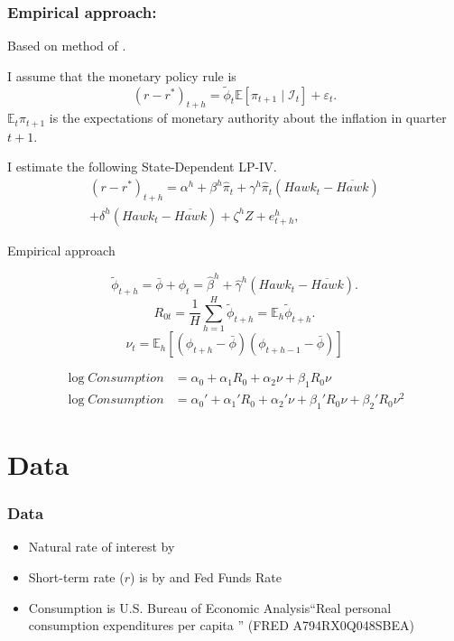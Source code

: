 \documentclass[11pt,pdf,aspectratio=129]{beamer}
\begin{document}
\begin{frame}\frametitle{Empirical approach:}
Based on method of \citet{HIM2023}.

I assume that the monetary policy rule is 
\[\left(r-r^*\right)_{t+h}=\tilde\phi_t\mathbb{E}\left[\pi_{t+1}\mid \mathcal{I}_t\right]+\varepsilon_t.\]
$\mathbb{E}_t\pi_{t+1}$ is the expectations of monetary authority about the inflation in quarter $t+1$.

I estimate the following State-Dependent LP-IV.
\begin{multline*}
    \left(r-r^*\right)_{t+h}=\alpha^h+\beta^h \hat\pi_t+\gamma^h \hat\pi_t\left(\mathit{Hawk}_{t}-\overline{\mathit{Hawk}}\right)\\ +\delta^h\left(\mathit{Hawk}_{t}-\overline{\mathit{Hawk}}\right)+\zeta^hZ+e_{t+h}^h,
\end{multline*}
\end{frame}

\begin{frame}{Empirical approach }

    \[\tilde \phi_{t+h}=\bar\phi+\phi_t=\hat \beta^h+\hat\gamma^h \left(\mathit{Hawk}_{t}-\overline{\mathit{Hawk}}\right).\]
    \[R_{0t}=\frac{1}{H}\sum_{h=1}^{H} \tilde \phi_{t+h}=\mathbb{E}_h \tilde \phi_{t+h}.\]
    \[\nu_t=\mathbb{E}_{h}\left[\left(\phi_{t+h}-\bar \phi\right)\left(\phi_{t+h-1}-\bar \phi\right)\right]\]

    \begin{align}
        \log \mathit{Consumption}&=\alpha_0+\alpha_1 R_0+\alpha_2\nu+\beta_1 R_0\nu \label{eq:linear}\\
        \log \mathit{Consumption}&=\alpha_0'+\alpha_1' R_0+\alpha_2'\nu+\beta_1' R_0\nu + \beta_2' R_0\nu^2\label{eq:quadratic}
    \end{align} 
\end{frame}






\section{Data}
\begin{frame}\frametitle{Data}
\begin{itemize}
        \item Natural rate of interest by \citet{HLW2017,HLW2023}
        \item Short-term rate ($r$) is by \citet{WuXia2016} and Fed Funds Rate 
        \item Consumption is U.S. Bureau of Economic Analysis``Real personal consumption expenditures per capita ''  (FRED A794RX0Q048SBEA) 
    \end{itemize}
\end{frame}
\end{document}
